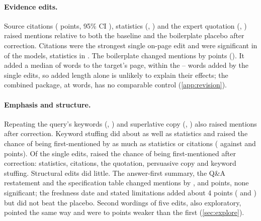 \paragraph{Evidence edits.} Source citations (\EMenAllCitations{} points, 95\% CI \EMenAllCitationsCI), statistics
(\EMenAllStatistics, \EMenAllStatisticsCI) and the expert quotation (\EMenAllQuotation, \EMenAllQuotationCI) raised
mentions relative to both the baseline and the boilerplate placebo after correction. Citations were the strongest single on-page
edit and were significant in \NSigMenCitationsW{} of the \NModelsTwo{} models, statistics in \NSigMenStatisticsW.
The boilerplate changed mentions by \EMenAllFiller{} points (\EMenAllFillerCI). It added a median of \RevPlaceboWords{} words
to the target's page, within the \RevSingleWordsMin--\RevSingleWordsMax{} words added by the single edits, so added
length alone is unlikely to explain their effects; the combined package, at \RevCombinedWords{} words, has no comparable
control (\cref{app:revision}).

\paragraph{Emphasis and structure.} Repeating the query's keywords (\EMenAllKeywordStuffing, \EMenAllKeywordStuffingCI)
and superlative copy (\EMenAllPersuasive, \EMenAllPersuasiveCI) also raised mentions after correction. Keyword stuffing
did about as well as statistics and raised the chance of being first-mentioned by as much as statistics or citations
(\ETopAllKeywordStuffingU{} against \ETopAllStatisticsU{} and \ETopAllCitationsU{} points). Of the \NSingle{} single
edits, \NTopSig{} raised the chance of being first-mentioned after correction: statistics, citations, the quotation,
persuasive copy and keyword stuffing. Structural edits did little. The answer-first summary, the Q\&A restatement and
the specification table changed mentions by \EMenAllAnswerFirst, \EMenAllQaFormat{} and \EMenAllSpecTable{} points, none
significant; the freshness date and stated limitations added about 4 points (\EMenAllFreshness{} and
\EMenAllLimitations) but did not beat the placebo. Second wordings of five edits, also exploratory, pointed the same way
and were \XWordMenMinU{} to \XWordMenMaxU{} points weaker than the first (\cref{sec:explore}).

\begin{table}[tp]
\centering\small
\caption{Effects of page treatments in percentage points relative to the baseline page in the same trial, pooled over
the 12 hosted models with equal weight, and the same effect on mentions pooled over the \FlNModelsTwo{} replication models
(\cref{sec:robust}) and the three small local models. $^{*}$Holm-adjusted $p<0.05$ within outcome. $^{\dagger}$Number of
hosted models with a significant positive effect on mentions. Per-model effects are in
\cref{tab:hostedmodels,tab:flagship,tab:study2full}.}
\label{tab:study2}
\resizebox{\linewidth}{!}{}
\end{table}

